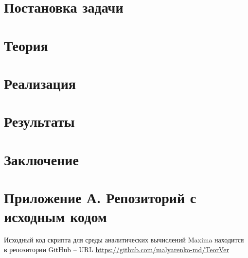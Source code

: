 \documentclass[12pt]{article}
\begin{document}
\begin{flushleft}

\setlength{\parindent}{1cm}

\tableofcontents

\newpage

\listoffigures

\newpage

\listoftables

\newpage

\section{Постановка задачи}

\newpage

\section{Теория}

\newpage

\section{Реализация}

\newpage

\section{Результаты}

\newpage

\section*{Заключение}

\newpage


\newpage

\section*{Приложение А. Репозиторий с исходным кодом}

Исходный код скрипта для среды аналитических вычислений Maxima находится в репозитории GitHub -- URL \url{https://github.com/malyarenko-md/TeorVer}

\end{flushleft}
\end{document}
